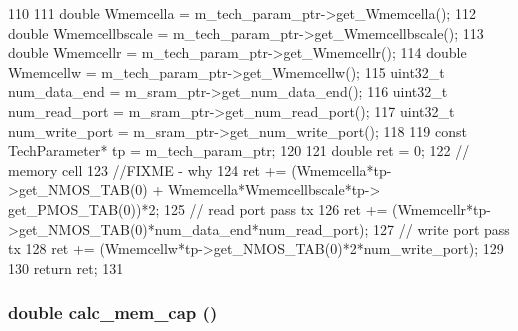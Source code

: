 \begin{DoxyCode}
110 {
111     double Wmemcella = m_tech_param_ptr->get_Wmemcella();
112     double Wmemcellbscale = m_tech_param_ptr->get_Wmemcellbscale();
113     double Wmemcellr = m_tech_param_ptr->get_Wmemcellr();
114     double Wmemcellw = m_tech_param_ptr->get_Wmemcellw();
115     uint32_t num_data_end = m_sram_ptr->get_num_data_end();
116     uint32_t num_read_port = m_sram_ptr->get_num_read_port();
117     uint32_t num_write_port = m_sram_ptr->get_num_write_port();
118 
119     const TechParameter* tp = m_tech_param_ptr;
120 
121     double ret = 0;
122     // memory cell
123     //FIXME - why
124     ret += (Wmemcella*tp->get_NMOS_TAB(0) + Wmemcella*Wmemcellbscale*tp->
      get_PMOS_TAB(0))*2;
125     // read port pass tx
126     ret += (Wmemcellr*tp->get_NMOS_TAB(0)*num_data_end*num_read_port);
127     // write port pass tx
128     ret += (Wmemcellw*tp->get_NMOS_TAB(0)*2*num_write_port);
129 
130     return ret;
131 }
\end{DoxyCode}
\hypertarget{classMemUnit_a37b41e9867b9efca4ea14b3067d1af47}{
\subsubsection[{calc\_\-mem\_\-cap}]{\setlength{\rightskip}{0pt plus 5cm}double calc\_\-mem\_\-cap ()}}
\label{classMemUnit_a37b41e9867b9efca4ea14b3067d1af47}



